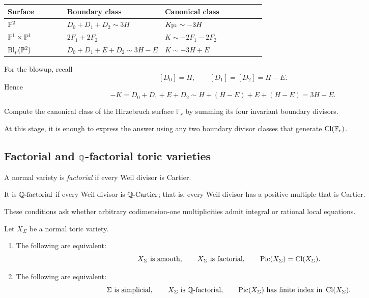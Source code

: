 \begin{center}
\small
\renewcommand{\arraystretch}{1.3}
\begin{tabularx}{0.94\linewidth}{@{}
  >{\raggedright\arraybackslash}p{0.23\linewidth}
  >{\raggedright\arraybackslash}p{0.36\linewidth}
  >{\raggedright\arraybackslash}X@{}}
\toprule
\textbf{Surface}
&
\textbf{Boundary class}
&
\textbf{Canonical class}
\\
\midrule
\(\PP^2\)
&
\(D_0+D_1+D_2\sim3H\)
&
\(K_{\PP^2}\sim-3H\)
\\
\(\PP^1\times\PP^1\)
&
\(2F_1+2F_2\)
&
\(K\sim-2F_1-2F_2\)
\\
\(\Blp{\PP^2}{p}\)
&
\(D_0+D_1+E+D_2\sim3H-E\)
&
\(K\sim-3H+E\)
\\
\bottomrule
\end{tabularx}
\end{center}

For the blowup, recall
\[
[D_0]=H,
\qquad
[D_1]=[D_2]=H-E.
\]
Hence
\[
-K
=
D_0+D_1+E+D_2
\sim
H+(H-E)+E+(H-E)
=
3H-E.
\]

\begin{pauseandthink}
Compute the canonical class of the Hirzebruch surface
\(\mathbb F_r\) by summing its four invariant boundary divisors.

At this stage, it is enough to express the answer using any two
boundary divisor classes that generate
\(\Cl(\mathbb F_r)\).
\end{pauseandthink}

\subsection{Factorial and \texorpdfstring{\(\QQ\)}{Q}-factorial toric varieties}

\begin{definition}
A normal variety is \emph{factorial} if every Weil divisor is Cartier.

It is \emph{\(\Qfactorial\)} if every Weil divisor is \(\QCartier\);
that is, every Weil divisor has a positive multiple that is Cartier.
\end{definition}

These conditions ask whether arbitrary codimension-one
multiplicities admit integral or rational local equations.

\begin{theorem}
\label{thm:factorial-qfactorial-fan}
Let \(X_\Sigma\) be a normal toric variety.

\begin{enumerate}[label=(\alph*),wide=0pt]
\item The following are equivalent:
\[
X_\Sigma\text{ is smooth},
\qquad
X_\Sigma\text{ is factorial},
\qquad
\Pic(X_\Sigma)=\Cl(X_\Sigma).
\]

\item The following are equivalent:
\[
\Sigma\text{ is simplicial},
\qquad
X_\Sigma\text{ is }\Qfactorial,
\qquad
\Pic(X_\Sigma)
\text{ has finite index in }
\Cl(X_\Sigma).
\]
\end{enumerate}
\end{theorem}

